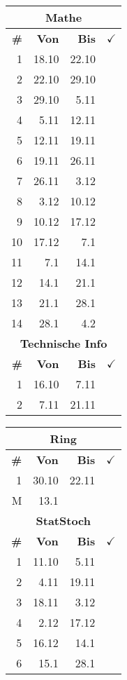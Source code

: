 \documentclass{article}
\begin{document}
\begin{table}
\begin{tabular}{r|r|r|l}
        \multicolumn{4}{c}{\textbf{Mathe}}\\
        \hline
        \hline
        \textbf{\#}&
        \textbf{Von}&
        \textbf{Bis}&
        $\checkmark$\\
        \hline
        \hline
        1&18.10&22.10\\
        2&22.10&29.10\\
        3&29.10&5.11\\
        4&5.11&12.11\\
        5&12.11&19.11\\
        6&19.11&26.11\\
        7&26.11&3.12\\
        8&3.12&10.12\\
        9&10.12&17.12\\
        10&17.12&7.1\\
        11&7.1&14.1\\
        12&14.1&21.1\\
        13&21.1&28.1\\
        14&28.1&4.2\\
        \hline
        \hline
        \multicolumn{4}{c}{\textbf{Technische Info}}\\
        \hline
        \hline
        \textbf{\#}&
        \textbf{Von}&
        \textbf{Bis}&
        $\checkmark$\\
        \hline
        \hline
        1&16.10&7.11&\\
        2&7.11&21.11&\\
        \hline
        \hline
    \end{tabular}
    \begin{tabular}{r|r|r|l}
        \multicolumn{4}{c}{\textbf{Ring}}\\
        \hline
        \hline
        \textbf{\#}&
        \textbf{Von}&
        \textbf{Bis}&
        $\checkmark$\\
        \hline
        \hline
        1&30.10&22.11&\\
        M&13.1&\\
        \hline
        \hline

        \multicolumn{4}{c}{\textbf{StatStoch}}\\
        \hline
        \hline
        \textbf{\#}&
        \textbf{Von}&
        \textbf{Bis}&
        $\checkmark$\\
        \hline
        \hline
        1&11.10&5.11\\
        2&4.11&19.11\\
        3&18.11&3.12\\
        4&2.12&17.12\\
        5&16.12&14.1\\
        6&15.1&28.1\\
        \hline
        \hline


\end{tabular}
\end{table}
\end{document}
